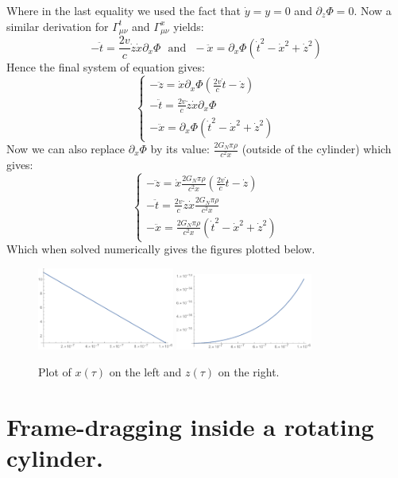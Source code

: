 \documentclass[10pt,a4paper]{article}
\begin{document}
\begin{enumerate}
\begin{enumerate}
\[\]
Where in the last equality we used the fact that $\dot{y} = y = 0$ and $\partial_z\Phi = 0$. Now a similar derivation for $\Gamma^t_{\mu \nu}$ and $\Gamma^x_{\mu \nu}$ yields:
\[
-\ddot{t} = \frac{2 v}{c} \dot{z} \dot{x} \partial_x \Phi \mbox{~~and~~}  -\ddot{x} = \partial_x \Phi (\dot{t}^2 - \dot{x}^2 + \dot{z}^2)
\]
Hence the final system of equation gives:
\[
\begin{cases}
-\ddot{z} = \dot{x} \partial_x \Phi \left( \frac{2v}{c} \dot{t} - \dot{z} \right)\\
-\ddot{t} = \frac{2v}{c} \dot{z}\dot{x} \partial_x \Phi\\
-\ddot{x} = \partial_x\Phi (\dot{t}^2 - \dot{x}^2 + \dot{z}^2)
\end{cases}
\]
Now we can also replace $\partial_x \Phi$ by its value: $\frac{2 G_N \pi \rho }{c^2 x}$ (outside of the cylinder) which gives:
\[
\begin{cases}
-\ddot{z} = \dot{x} \frac{2 G_N \pi \rho}{c^2 x} \left( \frac{2v}{c} \dot{t} - \dot{z} \right)\\
-\ddot{t} = \frac{2v}{c} \dot{z}\dot{x} \frac{2 G_N \pi \rho}{c^2 x}\\
-\ddot{x} = \frac{2 G_N \pi \rho}{c^2 x} (\dot{t}^2 - \dot{x}^2 + \dot{z}^2)
\end{cases}
\]
Which when solved numerically gives the figures plotted below.
\begin{figure}[h!]
\centering
\includegraphics[width = 0.4\textwidth]{fig2}
\includegraphics[width = 0.4\textwidth]{fig1}
\caption{Plot of $x(\tau)$ on the left and $z(\tau)$ on the right.}
\end{figure}

\end{enumerate}


\end{enumerate}

\section{Frame-dragging inside a rotating cylinder.}
\end{document}
